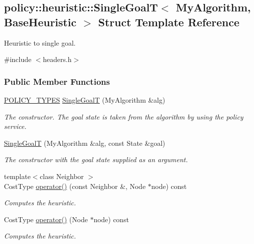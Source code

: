 \hypertarget{structpolicy_1_1heuristic_1_1SingleGoalT}{}\subsection{policy\+:\+:heuristic\+:\+:Single\+GoalT$<$ My\+Algorithm, Base\+Heuristic $>$ Struct Template Reference}
\label{structpolicy_1_1heuristic_1_1SingleGoalT}


Heuristic to single goal.  




{\ttfamily \#include $<$headers.\+h$>$}

\subsubsection*{Public Member Functions}
\begin{DoxyCompactItemize}
\item 
\hyperlink{extensions_2shared__policies_2headers_8h_ae70a06fa4631780beea14971eb36a562}{P\+O\+L\+I\+C\+Y\+\_\+\+T\+Y\+P\+ES} \hyperlink{structpolicy_1_1heuristic_1_1SingleGoalT_a6a6724d51bcb729675e0140353ddf8e8}{Single\+GoalT} (My\+Algorithm \&alg)
\begin{DoxyCompactList}\small\item\em The constructor. The goal state is taken from the algorithm by using the policy service. \end{DoxyCompactList}\item 
\hyperlink{structpolicy_1_1heuristic_1_1SingleGoalT_af51b831b599c371c21a3295087c94c15}{Single\+GoalT} (My\+Algorithm \&alg, const State \&goal)
\begin{DoxyCompactList}\small\item\em The constructor with the goal state supplied as an argument. \end{DoxyCompactList}\item 
{\footnotesize template$<$class Neighbor $>$ }\\Cost\+Type \hyperlink{structpolicy_1_1heuristic_1_1SingleGoalT_a4d55dcd25ce87c8078b178893e60d9d8}{operator()} (const Neighbor \&, Node $\ast$node) const 
\begin{DoxyCompactList}\small\item\em Computes the heuristic. \end{DoxyCompactList}\item 
Cost\+Type \hyperlink{structpolicy_1_1heuristic_1_1SingleGoalT_a19c9a99bf06ee70543ed3241a008f9a5}{operator()} (Node $\ast$node) const 
\begin{DoxyCompactList}\small\item\em Computes the heuristic. \end{DoxyCompactList}\end{DoxyCompactItemize}
